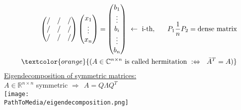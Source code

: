 \begin{frame}
~\\
{\blank
\begin{align*}
\begin{pmatrix}
/&/&/\\
/&/&/\\
/&/&/
\end{pmatrix}
\begin{pmatrix}
x_1\\\vdots\\x_n
\end{pmatrix}
=\begin{pmatrix}
b_1\\\vdots\\b_i\\\vdots\\b_n
\end{pmatrix}~\leftarrow~\text{i-th},~~~~~
P_1 \frac{1}{n} P_2 = \text{dense matrix}\\
\textcolor{orange}{(A\in\mathbb{C}^{n\times n}~\text{is called hermitation}~:\Leftrightarrow~~\bar{A}^T=A)}
\end{align*}
\underline{Eigendecomposition of symmetric matrices:}\\
$A\in\mathbb{R}^{n\times n}$ symmetric $\Rightarrow~~A=Q\Lambda Q^T$\\
\texttt{[image: \\PathToMedia/eigendecomposition.png]}
}
\end{frame}

